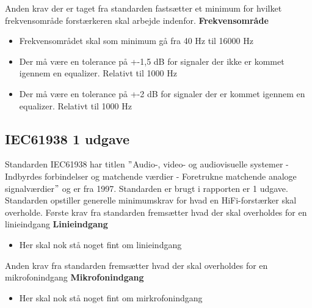 Anden krav der er taget fra standarden fastsætter et minimum for hvilket frekvensområde forstærkeren skal arbejde indenfor.
\newline 
\newline
\textbf{Frekvensområde}
\begin{itemize}
\item Frekvensområdet skal som minimum gå fra 40 Hz til 16000 Hz
\item Der må være en tolerance på +-1,5 dB for signaler der ikke er kommet igennem en equalizer. Relativt til 1000 Hz
\item Der må være en tolerance på +-2 dB for signaler der er kommet igennem en equalizer. Relativt til 1000 Hz
\end{itemize}


\subsection*{IEC61938 1 udgave}
\label{IEC61938}
Standarden IEC61938 har titlen $"$Audio-, video- og audiovisuelle systemer - Indbyrdes forbindelser og matchende værdier - Foretrukne matchende analoge signalværdier$"$ og er fra 1997. Standarden er brugt i rapporten er 1 udgave. Standarden opstiller generelle minimumskrav for hvad en HiFi-forstærker skal overholde. \cite{IEC61938}%
\newline
\newline
Første krav fra standarden fremsætter hvad der skal overholdes for en linieindgang
\newline
\newline
\textbf{Linieindgang}
\begin{itemize}
\item Her skal nok stå noget fint om linieindgang
\end{itemize}
Anden krav fra standarden fremsætter hvad der skal overholdes for en mikrofonindgang
\newline 
\newline
\textbf{Mikrofonindgang}
\begin{itemize}
\item  Her skal nok stå noget fint om mirkrofonindgang
\end{itemize}

